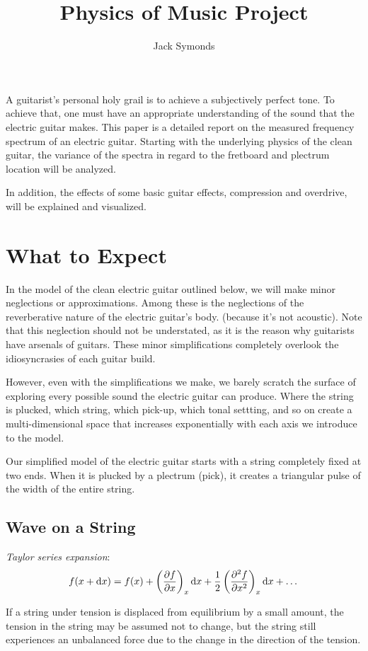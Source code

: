 \documentclass[10pt, a4paper]{article}
\author{Jack Symonds}
\title{Physics of Music Project}
\date{}
\newcommand{\deff}[1]{\par \noindent \textit{#1}: }
\begin{document}
\maketitle

\abstract
A guitarist's personal holy grail is to achieve a subjectively perfect tone.
To achieve that, one must have an appropriate understanding of the sound that the electric guitar makes.
This paper is a detailed report on the measured frequency spectrum of an electric guitar.
Starting with the underlying physics of the clean guitar, the variance of the spectra in regard to the fretboard and plectrum location will be analyzed. 

In addition, the effects of some basic guitar effects, compression and overdrive, will be explained and visualized.



\section{What to Expect}
In the model of the clean electric guitar outlined below,
we will make minor neglections or approximations.
Among these is the neglections of the reverberative nature of the electric guitar's body. (because it's not acoustic). 
Note that this neglection should not be understated, as it is the reason why guitarists have arsenals of guitars.
These minor simplifications completely overlook the idiosyncrasies of each guitar build.

However, even with the simplifications we make, we barely scratch the surface of exploring every possible sound the electric guitar can produce. Where the string is plucked, which string, which pick-up, which tonal settting, and so on create a multi-dimensional space that increases exponentially with each axis we introduce to the model.

Our simplified model of the electric guitar starts with a string completely fixed at two ends. When it is plucked by a plectrum (pick), it creates a triangular pulse of the width of the entire string.

\subsection{Wave on a String}

\deff{Taylor series expansion}
\[ f(x + \dd x) = f(x) + \left( \pdv{f}{x} \right) _x \dd x
+ \frac12 \left( \pdv[2]{f}{x} \right) _x \dd x + \dots \]

If a string under tension is displaced from equilibrium by a small amount, the tension in the string may be assumed not to change, but the string still experiences an unbalanced force due to the change in the direction of the tension.
\end{document}
